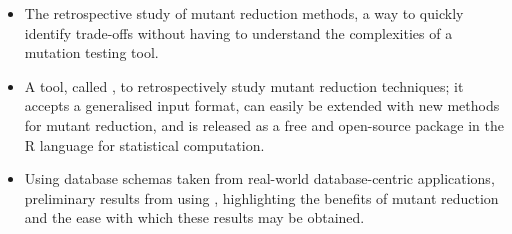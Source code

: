 \begin{itemize}

  \item The retrospective study of mutant reduction methods, a way to quickly identify trade-offs without having to
    understand the complexities of a mutation testing tool.


  \item A tool, called \mr, to retrospectively study mutant reduction techniques; it accepts a generalised input format,
    can easily be extended with new methods for mutant reduction, and is released as a free and open-source package in
    the R language for statistical computation.

  \item Using database schemas taken from real-world database-centric applications, preliminary results from using
    \mr, highlighting the benefits of mutant reduction and the ease with which these results may be obtained.

\end{itemize}



